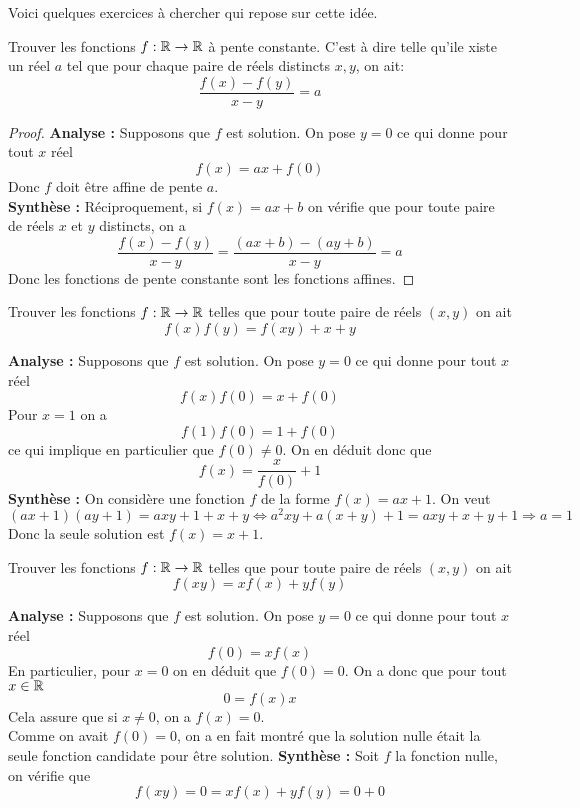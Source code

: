Voici quelques exercices à chercher qui repose sur cette idée.
\begin{exo}[F]
Trouver les fonctions $f:\mathbb R\to \mathbb R$ à pente constante. C'est à dire telle qu'ile xiste un réel $a$ tel que pour chaque paire de réels distincts $x,y$, on ait:
$$\frac{f(x)-f(y)}{x-y}=a $$
\end{exo}

\begin{proof}
\textbf{Analyse :} Supposons que $f$ est solution. On pose $y=0$ ce qui donne pour tout $x$ réel
$$f(x)=ax+f(0) $$
Donc $f$ doit être affine de pente $a$.
\\
\textbf{Synthèse :} Réciproquement, si $f(x)=ax+b$ on vérifie que pour toute paire de réels $x$ et $y$ distincts, on a
$$\frac{f(x)-f(y)}{x-y}=\frac{(ax+b)-(ay+b)}{x-y}=a $$
Donc les fonctions de pente constante sont les fonctions affines.
\end{proof}
\begin{exo}[F]
Trouver les fonctions $f:\mathbb R\to \mathbb R$ telles que pour toute paire de réels $(x,y)$ on ait
$$f(x)f(y)=f(xy)+x+y $$
\end{exo}
\begin{preuve}
\textbf{Analyse :} Supposons que $f$ est solution. On pose $y=0$ ce qui donne pour tout $x$ réel
$$f(x)f(0)=x+f(0) $$
Pour $x=1$ on a
$$f(1)f(0)=1+f(0) $$ ce qui implique en particulier que $f(0)\ne 0$. On en déduit donc que
$$f(x)=\frac{x}{f(0)}+1 $$
\textbf{Synthèse :} On considère une fonction $f$ de la forme $f(x)=ax+1$. On veut
$$(ax+1)(ay+1)=axy+1+x+y\iff a^2xy+a(x+y)+1=axy+x+y+1\Rightarrow a=1 $$
Donc la seule solution est $f(x)=x+1$.
\end{preuve}
\begin{exo}[F]
Trouver les fonctions $f:\mathbb R\to \mathbb R$ telles que pour toute paire de réels $(x,y)$ on ait
$$f(xy)=xf(x)+yf(y) $$
\end{exo}


\begin{preuve}
\textbf{Analyse :} Supposons que $f$ est solution. On pose $y=0$ ce qui donne pour tout $x$ réel
$$f(0)=xf(x) $$
En particulier, pour $x=0$ on en déduit que $f(0)=0$. On a donc que pour tout $x\in \mathbb R$
$$0=f(x)x $$ Cela assure que si $x\ne 0$, on a $f(x)=0$. \\

Comme on avait $f(0)=0$, on a en fait montré que la solution nulle était la seule fonction candidate pour être solution.
\textbf{Synthèse :} Soit $f$ la fonction nulle, on vérifie que
$$f(xy)=0=xf(x)+yf(y)=0+0 $$
\end{preuve}


